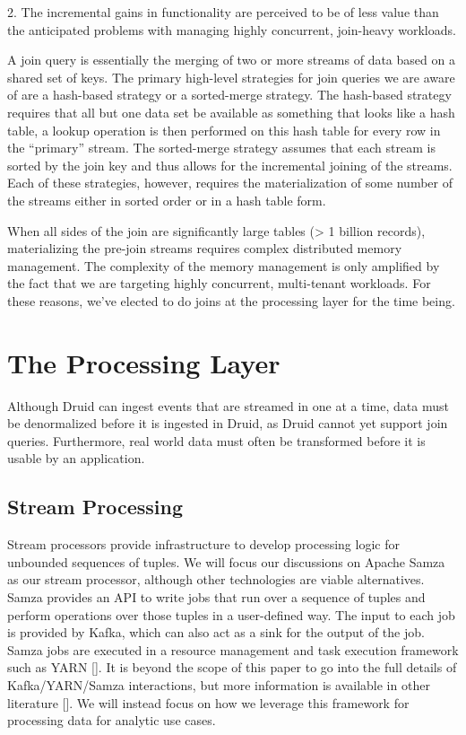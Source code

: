 \documentclass{vldb}
\begin{document}
2. The incremental gains in functionality are perceived to be of less value
than the anticipated problems with managing highly concurrent, join-heavy
workloads. 

A join query is essentially the merging of two or more streams of data based on
a shared set of keys. The primary high-level strategies for join queries we are
aware of are a hash-based strategy or a sorted-merge strategy. The hash-based
strategy requires that all but one data set be available as something that
looks like a hash table, a lookup operation is then performed on this hash
table for every row in the “primary” stream. The sorted-merge strategy assumes
that each stream is sorted by the join key and thus allows for the incremental
joining of the streams. Each of these strategies, however, requires the
materialization of some number of the streams either in sorted order or in a
hash table form.

When all sides of the join are significantly large tables (> 1 billion
records), materializing the pre-join streams requires complex distributed
memory management. The complexity of the memory management is only amplified by
the fact that we are targeting highly concurrent, multi-tenant workloads. For
these reasons, we’ve elected to do joins at the processing layer for the time
being.

\section{The Processing Layer}
\label{sec:processing}
Although Druid can ingest events that are streamed in one at a time, data must
be denormalized before it is ingested in Druid, as Druid cannot yet support
join queries. Furthermore, real world data must often be transformed before it
is usable by an application.

\subsection{Stream Processing}
\label{sec:streamprocessing}
Stream processors provide infrastructure to develop processing logic for
unbounded sequences of tuples. We will focus our discussions on Apache Samza as
our stream processor, although other technologies are viable alternatives.
Samza provides an API to write jobs that run over a sequence of tuples and
perform operations over those tuples in a user-defined way. The input to each
job is provided by Kafka, which can also act as a sink for the output of the
job. Samza jobs are executed in a resource management and task execution
framework such as YARN []. It is beyond the scope of this paper to go into the
full details of Kafka/YARN/Samza interactions, but more information is
available in other literature []. We will instead focus on how we leverage this
framework for processing data for analytic use cases.
\end{document}
